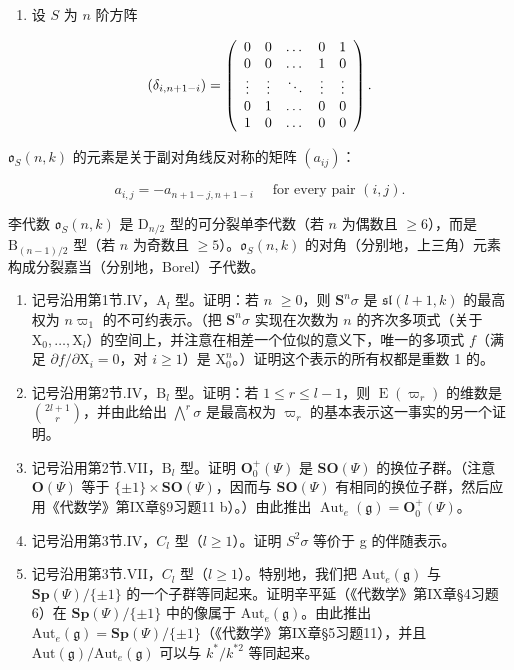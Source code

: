 \begin{enumerate}
\def\labelenumi{\arabic{enumi})}
\setcounter{enumi}{3}
\tightlist
\item
  设 \(S\) 为 \(n\) 阶方阵
\end{enumerate}

\[
(\delta_ {i, n + 1 - i}) = \left( \begin{array}{c c c c c} 0 & 0 & \dots & 0 & 1 \\ 0 & 0 & \dots & 1 & 0 \\ \vdots & \vdots & \ddots & \vdots & \vdots \\ 0 & 1 & \dots & 0 & 0 \\ 1 & 0 & \dots & 0 & 0 \end{array} \right).
\]

\(\mathfrak{o}_{S}(n,k)\) 的元素是关于副对角线反对称的矩阵 \((a_{ij})\)：

\[
a _ {i, j} = - a _ {n + 1 - j, n + 1 - i} \quad \text {   for   every   pair   } (i, j).
\]

李代数 \(\mathfrak{o}_S(n,k)\) 是 \(\mathrm{D}_{n/2}\) 型的可分裂单李代数（若 \(n\) 为偶数且 \(\geq 6\)），而是 \(\mathrm{B}_{(n-1)/2}\) 型（若 \(n\) 为奇数且 \(\geq 5\)）。\(\mathfrak{o}_S(n,k)\) 的对角（分别地，上三角）元素构成分裂嘉当（分别地，Borel）子代数。

\begin{enumerate}
\def\labelenumi{\arabic{enumi})}
\setcounter{enumi}{4}
\item
  记号沿用第1节.IV，\(\mathrm{A}_l\) 型。证明：若 \(n\) \(\geq 0\)，则 \(\mathbf{S}^n\sigma\) 是 \(\mathfrak{sl}(l + 1,k)\) 的最高权为 \(n\varpi_1\) 的不可约表示。（把 \(\mathbf{S}^n\sigma\) 实现在次数为 \(n\) 的齐次多项式（关于 \(\mathrm{X}_0,\dots ,\mathrm{X}_l\)）的空间上，并注意在相差一个位似的意义下，唯一的多项式 \(f\)（满足 \(\partial f / \partial \mathrm{X}_i = 0\)，对 \(i\geq 1\)）是 \(\mathrm{X}_0^n\)。）证明这个表示的所有权都是重数 1 的。
\item
  记号沿用第2节.IV，\(\mathrm{B}_l\) 型。证明：若 \(1 \leq r \leq l - 1\)，则 \(\operatorname{E}(\varpi_r)\) 的维数是 \(\binom{2l + 1}{r}\)，并由此给出 \(\bigwedge^r \sigma\) 是最高权为 \(\varpi_r\) 的基本表示这一事实的另一个证明。
\item
  记号沿用第2节.VII，\(\mathrm{B}_l\) 型。证明 \(\mathbf{O}_0^+ (\Psi)\) 是 \(\mathbf{SO}(\Psi)\) 的换位子群。（注意 \(\mathbf{O}(\Psi)\) 等于 \(\{\pm 1\} \times \mathbf{SO}(\Psi)\)，因而与 \(\mathbf{SO}(\Psi)\) 有相同的换位子群，然后应用《代数学》第IX章§9习题11 b）。）由此推出 \(\operatorname{Aut}_e(\mathfrak{g}) = \mathbf{O}_0^+ (\Psi)\)。
\item
  记号沿用第3节.IV，\(C_{l}\) 型（\(l \geq 1\)）。证明 \(S^{2}\sigma\) 等价于 g 的伴随表示。
\item
  记号沿用第3节.VII，\(C_l\) 型（\(l \geq 1\)）。特别地，我们把 \(\mathrm{Aut}_e(\mathfrak{g})\) 与 \(\mathbf{Sp}(\varPsi)/\{\pm 1\}\) 的一个子群等同起来。证明辛平延（《代数学》第IX章§4习题6）在 \(\mathbf{Sp}(\varPsi)/\{\pm 1\}\) 中的像属于 \(\mathrm{Aut}_e(\mathfrak{g})\)。由此推出 \(\mathrm{Aut}_e(\mathfrak{g}) = \mathbf{Sp}(\varPsi)/\{\pm 1\}\)（《代数学》第IX章§5习题11），并且 \(\mathrm{Aut}(\mathfrak{g})/\mathrm{Aut}_e(\mathfrak{g})\) 可以与 \(k^*/k^{*2}\) 等同起来。
\end{enumerate}

